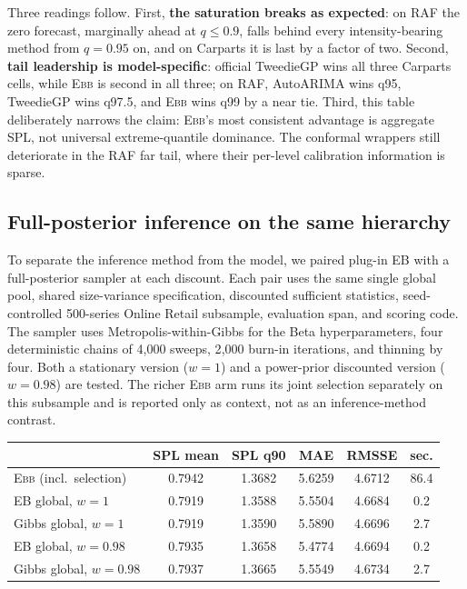 \documentclass[twocolumn,10pt]{article}
\theoremstyle{definition}
\newcommand{\EBB}{\textsc{Ebb}}
\begin{document}
Three readings follow. First, \textbf{the saturation breaks as expected}:
on RAF the zero forecast, marginally ahead at $q\le0.9$, falls behind
every intensity-bearing method from $q{=}0.95$ on, and on Carparts it is
last by a factor of two. Second, \textbf{tail leadership is
model-specific}: official TweedieGP wins all three Carparts cells, while
\EBB{} is second in all three; on RAF, AutoARIMA wins q95, TweedieGP
wins q97.5, and \EBB{} wins q99 by a near tie. Third, this table
deliberately narrows the claim: \EBB{}'s most consistent advantage is
aggregate SPL, not universal extreme-quantile dominance. The conformal
wrappers still deteriorate in the RAF far tail, where their per-level
calibration information is sparse.

\subsection{Full-posterior inference on the same hierarchy}
\label{app:mcmc}

To separate the inference method from the model, we paired plug-in EB
with a full-posterior sampler at each discount. Each pair uses the same
single global pool, shared size-variance specification, discounted
sufficient statistics, seed-controlled 500-series Online Retail subsample,
evaluation span, and scoring code. The sampler uses
Metropolis-within-Gibbs for the Beta hyperparameters, four deterministic
chains of 4{,}000 sweeps, 2{,}000 burn-in iterations, and thinning by four.
Both a stationary version ($w{=}1$) and a power-prior discounted version
($w{=}0.98$) are tested. The richer \EBB{} arm runs its joint
selection separately on this subsample and is
reported only as context, not as an inference-method contrast.

\begin{table}[h]
\centering
\small
\begin{tabular}{lccccc}
\toprule
 & SPL mean & SPL q90 & MAE & RMSSE & sec.\\
\midrule
\EBB{} (incl.\ selection) & 0.7942 & 1.3682 & 5.6259 & 4.6712 & 86.4\\
EB global, $w{=}1$ & 0.7919 & 1.3588 & 5.5504 & 4.6684 & 0.2\\
Gibbs global, $w{=}1$ & 0.7919 & 1.3590 & 5.5890 & 4.6696 & 2.7\\
EB global, $w{=}0.98$ & 0.7935 & 1.3658 & 5.4774 & 4.6694 & 0.2\\
Gibbs global, $w{=}0.98$ & 0.7937 & 1.3665 & 5.5549 & 4.6734 & 2.7\\
\bottomrule
\end{tabular}
\end{table}
\end{document}
